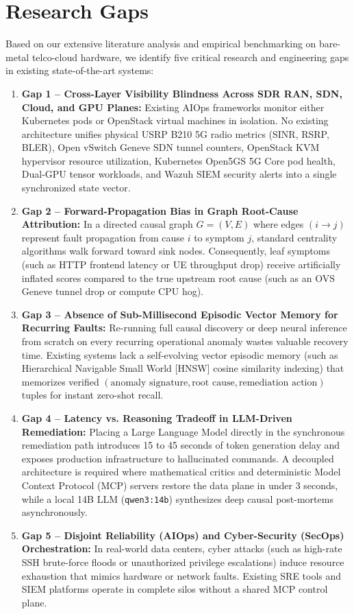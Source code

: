 \section{Research Gaps}
Based on our extensive literature analysis and empirical benchmarking on bare-metal telco-cloud hardware, we identify five critical research and engineering gaps in existing state-of-the-art systems:
\begin{enumerate}
    \item \textbf{Gap 1 -- Cross-Layer Visibility Blindness Across SDR RAN, SDN, Cloud, and GPU Planes:} Existing AIOps frameworks monitor either Kubernetes pods or OpenStack virtual machines in isolation. No existing architecture unifies physical USRP B210 5G radio metrics (SINR, RSRP, BLER), Open vSwitch Geneve SDN tunnel counters, OpenStack KVM hypervisor resource utilization, Kubernetes Open5GS 5G Core pod health, Dual-GPU tensor workloads, and Wazuh SIEM security alerts into a single synchronized state vector.
    \item \textbf{Gap 2 -- Forward-Propagation Bias in Graph Root-Cause Attribution:} In a directed causal graph $G=(V,E)$ where edges $(i \to j)$ represent fault propagation from cause $i$ to symptom $j$, standard centrality algorithms walk forward toward sink nodes. Consequently, leaf symptoms (such as HTTP frontend latency or UE throughput drop) receive artificially inflated scores compared to the true upstream root cause (such as an OVS Geneve tunnel drop or compute CPU hog).
    \item \textbf{Gap 3 -- Absence of Sub-Millisecond Episodic Vector Memory for Recurring Faults:} Re-running full causal discovery or deep neural inference from scratch on every recurring operational anomaly wastes valuable recovery time. Existing systems lack a self-evolving vector episodic memory (such as Hierarchical Navigable Small World [HNSW] cosine similarity indexing) that memorizes verified $(\text{anomaly signature}, \text{root cause}, \text{remediation action})$ tuples for instant zero-shot recall.
    \item \textbf{Gap 4 -- Latency vs. Reasoning Tradeoff in LLM-Driven Remediation:} Placing a Large Language Model directly in the synchronous remediation path introduces 15 to 45 seconds of token generation delay and exposes production infrastructure to hallucinated commands. A decoupled architecture is required where mathematical critics and deterministic Model Context Protocol (MCP) servers restore the data plane in under 3 seconds, while a local 14B LLM (\texttt{qwen3:14b}) synthesizes deep causal post-mortems asynchronously.
    \item \textbf{Gap 5 -- Disjoint Reliability (AIOps) and Cyber-Security (SecOps) Orchestration:} In real-world data centers, cyber attacks (such as high-rate SSH brute-force floods or unauthorized privilege escalations) induce resource exhaustion that mimics hardware or network faults. Existing SRE tools and SIEM platforms operate in complete silos without a shared MCP control plane.
\end{enumerate}

